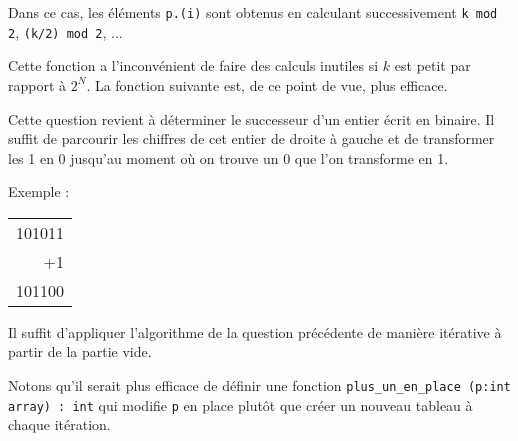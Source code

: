 Dans ce cas, les éléments \texttt{p.(i)} sont obtenus en calculant successivement \texttt{k mod 2}, \texttt{(k/2) mod 2}, ...



Cette fonction a l'inconvénient de faire des calculs inutiles si $k$ est petit par rapport à $2^N$. La fonction suivante est, de ce point de vue, plus efficace.



\Q
Cette question revient à déterminer le successeur d'un entier écrit en binaire. Il suffit de parcourir les chiffres de cet entier de droite à gauche et de transformer les 1 en 0 jusqu'au moment où on trouve un 0 que l'on transforme en 1.
\medskip

Exemple :
\begin{tabular}{r}
    101011\\
    +1\\
    \hline
    101100\\
\end{tabular}



\Q
Il suffit d'appliquer l'algorithme de la question précédente de manière itérative à partir de la partie vide.


\medskip

Notons qu'il serait plus efficace de définir une fonction \texttt{plus\_un\_en\_place (p:int array) : int} qui modifie \texttt{p} en place plutôt que créer un nouveau tableau à chaque itération.
\bigskip

\Fin
